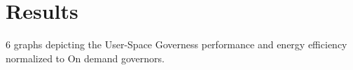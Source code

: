 \section{Results}\label{sec:results}



6 graphs depicting the User-Space Governess performance and 
energy efficiency normalized to On demand governors.
